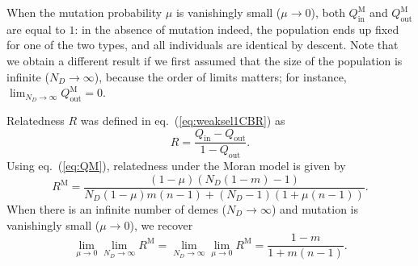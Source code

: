 \documentclass[11pt, letterpaper]{article}
\renewcommand{\eqref}[1]{\textup{{\normalfont eq.~(\ref{#1}}\normalfont)}}
\newcommand{\Moran}{\textrm{M}}
\newcommand{\inn}{\textrm{in}}
\newcommand{\out}{\textrm{out}}
\newcommand{\Qin}{Q_{\inn}}
\newcommand{\Qout}{Q_{\out}}
\newcommand{\ndemes}{N_D}
\begin{document}
When the mutation probability $\mu$ is vanishingly small ($\mu \to 0$), both $\Qin^{\Moran}$ and $\Qout^{\Moran}$ are equal to $1$: in the absence of mutation indeed, the population ends up fixed for one of the two types, and all individuals are identical by descent. Note that we obtain a different result if we first assumed that the size of the population is infinite ($\ndemes \to \infty$), because the order of limits matters; %
for instance, $\lim_{\ndemes\to \infty} \Qout^{\Moran}=0$. 

Relatedness $R$ was defined in \eqref{eq:weaksel1CBR} as
\begin{displaymath}
R = \frac{Q_{\inn} - Q_{\out}}{1 - Q_{\out}}.
\end{displaymath}
Using \eqref{eq:QM}, relatedness under the Moran model is given by 
%
\begin{equation}\label{eq:app:RM}
R^{\Moran} = \frac{(1-\mu ) (\ndemes (1-m)-1)}{\ndemes (1-\mu ) m (n-1)+(\ndemes-1) ( 1 + \mu (n-1))}.
\end{equation}
When there is an infinite number of demes ($\ndemes \to \infty$) and mutation is vanishingly small ($\mu \to 0$), we recover
\begin{equation}\label{eq:app:RMlim}
\lim_{\mu \to 0} \lim_{\ndemes \to \infty} R^{\Moran} =  \lim_{\ndemes \to \infty} \lim_{\mu \to 0} R^{\Moran} = \frac{1 - m}{1 + m (n - 1)}.
\end{equation}
\end{document}
